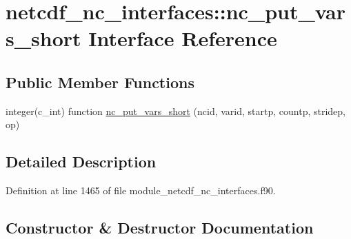 \hypertarget{interfacenetcdf__nc__interfaces_1_1nc__put__vars__short}{}\section{netcdf\+\_\+nc\+\_\+interfaces\+:\+:nc\+\_\+put\+\_\+vars\+\_\+short Interface Reference}
\label{interfacenetcdf__nc__interfaces_1_1nc__put__vars__short}
\subsection*{Public Member Functions}
\begin{DoxyCompactItemize}
\item 
integer(c\+\_\+int) function \hyperlink{interfacenetcdf__nc__interfaces_1_1nc__put__vars__short_a0a84fc1c2848f242bd47dd6fc49a8efc}{nc\+\_\+put\+\_\+vars\+\_\+short} (ncid, varid, startp, countp, stridep, op)
\end{DoxyCompactItemize}


\subsection{Detailed Description}


Definition at line 1465 of file module\+\_\+netcdf\+\_\+nc\+\_\+interfaces.\+f90.



\subsection{Constructor \& Destructor Documentation}
\mbox{\label{interfacenetcdf__nc__interfaces_1_1nc__put__vars__short_a0a84fc1c2848f242bd47dd6fc49a8efc}} 
